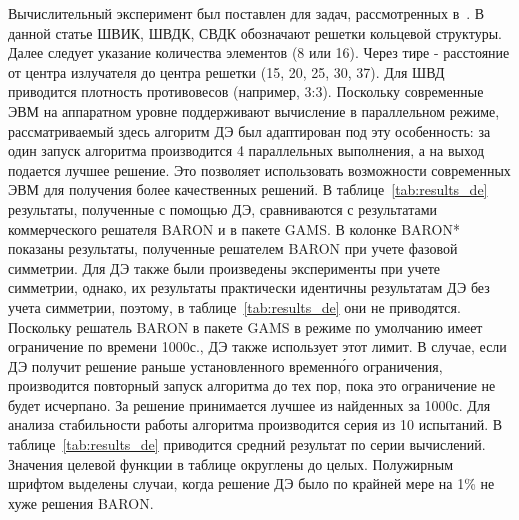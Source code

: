 \documentclass{llncs}
\begin{document}
Вычислительный эксперимент был поставлен для задач, рассмотренных в~\cite{tyunin:daor,tyunin:oniip}. В данной статье ШВИК, ШВДК, СВДК обозначают решетки кольцевой структуры. Далее следует указание количества элементов (8 или 16). Через тире - расстояние от центра излучателя до центра решетки (15, 20, 25, 30, 37). Для ШВД приводится плотность противовесов (например, 3:3). Поскольку современные ЭВМ на аппаратном уровне поддерживают вычисление в параллельном режиме, рассматриваемый здесь алгоритм ДЭ был адаптирован под эту особенность: за один запуск алгоритма производится 4 параллельных выполнения, а на выход подается лучшее решение. Это позволяет использовать возможности современных ЭВМ для получения более качественных решений. В таблице~\ref{tab:results_de} результаты, полученные с помощью ДЭ, сравниваются с результатами коммерческого решателя BARON и в пакете GAMS. В колонке BARON* показаны результаты, полученные решателем BARON при учете фазовой симметрии. Для ДЭ также были произведены эксперименты при учете симметрии, однако, их результаты практически идентичны результатам ДЭ без учета симметрии, поэтому, в таблице~\ref{tab:results_de} они не приводятся. Поскольку решатель BARON в пакете GAMS в режиме по умолчанию имеет ограничение по времени 1000с., ДЭ также использует этот лимит. В случае, если ДЭ получит решение раньше установленного временн\'{о}го ограничения, производится повторный запуск алгоритма до тех пор, пока это ограничение не будет исчерпано. За решение принимается лучшее из найденных за 1000с. Для анализа стабильности работы алгоритма производится серия из 10 испытаний. В таблице~\ref{tab:results_de} приводится средний результат по серии вычислений. Значения целевой функции в таблице округлены до целых. Полужирным шрифтом выделены случаи, когда решение ДЭ было по крайней мере на 1\% не хуже решения BARON. 
\end{document}
